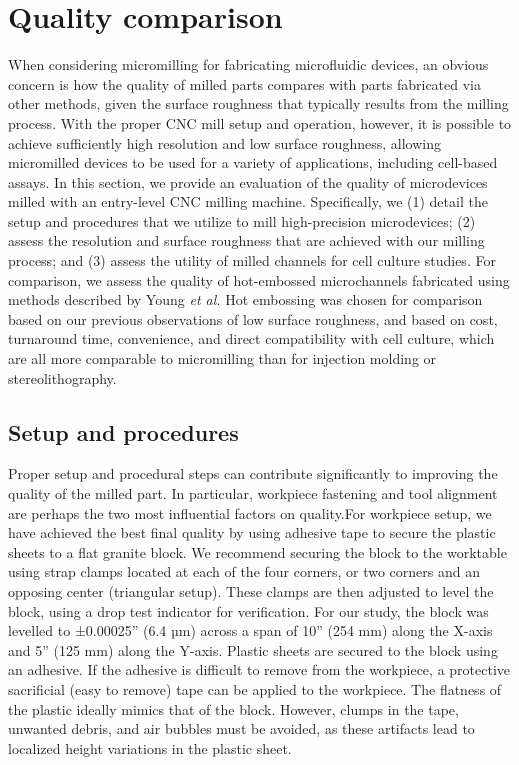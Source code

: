 \section{Quality comparison}
When considering micromilling for fabricating microfluidic devices, an obvious concern is how the quality of milled parts compares with parts fabricated via other methods, given the surface roughness that typically results from the milling process. With the proper CNC mill setup and operation, however, it is possible to achieve sufficiently high resolution and low surface roughness, allowing micromilled devices to be used for a variety of applications, including cell-based assays.  In this section, we provide an evaluation of the quality of microdevices milled with an entry-level CNC milling machine. Specifically, we (1) detail the setup and procedures that we utilize to mill high-precision microdevices; (2) assess the resolution and surface roughness that are achieved with our milling process; and (3) assess the utility of milled channels for cell culture studies. For comparison, we assess the quality of hot-embossed microchannels fabricated using methods described by Young \textit{et al.} \cite{Young2011} Hot embossing was chosen for comparison based on our previous observations of low surface roughness, and based on cost, turnaround time, convenience, and direct compatibility with cell culture, which are all more comparable to micromilling than for injection molding or stereolithography. 


\subsection{Setup and procedures}
Proper setup and procedural steps can contribute significantly to improving the quality of the milled part. In particular, workpiece fastening and tool alignment are perhaps the two most influential factors on quality.For workpiece setup, we have achieved the best final quality by using adhesive tape to secure the plastic sheets to a flat granite block. We recommend securing the block to the worktable using strap clamps located at each of the four corners, or two corners and an opposing center (triangular setup).  These clamps are then adjusted to level the block, using a drop test indicator for verification. For our study, the block was levelled to ±0.00025” (6.4 µm) across a span of 10” (254 mm) along the X-axis and 5” (125 mm) along the Y-axis. Plastic sheets are secured to the block using an adhesive. If the adhesive is difficult to remove from the workpiece, a protective sacrificial (easy to remove) tape can be applied to the workpiece. The flatness of the plastic ideally mimics that of the block. However, clumps in the tape, unwanted debris, and air bubbles must be avoided, as these artifacts lead to localized height variations in the plastic sheet.


